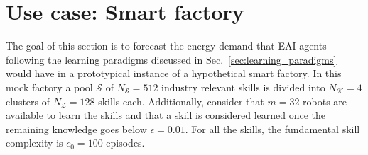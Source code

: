 \section{Use case: Smart factory}
The goal of this section is to forecast the energy demand that EAI agents following the learning paradigms discussed in Sec.~\ref{sec:learning_paradigms} would have in a prototypical instance of a hypothetical smart factory. In this mock factory a pool $\mathcal{S}$ of $N_\mathcal{S}= 512$ industry relevant skills is divided into $N_\mathcal{K}=4$ clusters of $N_\mathcal{Z} = 128$ skills each. Additionally, consider that $m=32$ robots are available to learn the skills and that a skill is considered learned once the remaining knowledge goes below $\epsilon = 0.01$. For all the skills, the fundamental skill complexity is $c_0 = 100$ episodes.

